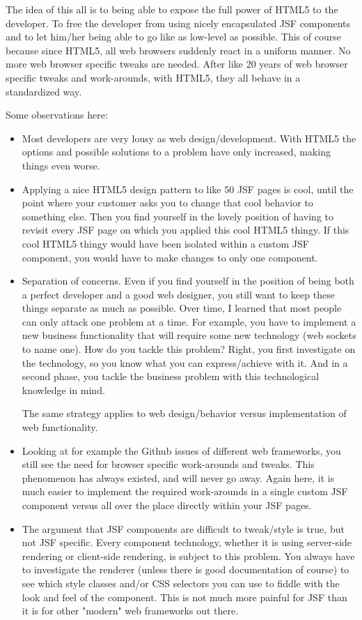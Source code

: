 The idea of this all is to being able to expose the full power of HTML5 to the developer.
To free the developer from using nicely encapsulated JSF components and to let him/her being able to go like as low-level as possible.
This of course because since HTML5, all web browsers suddenly react in a uniform manner.
No more web browser specific tweaks are needed.
After like 20 years of web browser specific tweaks and work-arounds, with HTML5, they all behave in a standardized way.

Some observations here:
\begin{itemize}
	\item Most developers are very lousy as web design/development. With HTML5 the options and possible solutions to a problem have only increased, making things even worse.
	\item Applying a nice HTML5 design pattern to like 50 JSF pages is cool, until the point where your customer asks you to change that cool behavior to something else. Then you find yourself in the lovely position of having to revisit every JSF page on which you applied this cool HTML5 thingy.
	If this cool HTML5 thingy would have been isolated within a custom JSF component, you would have to make changes to only one component.
	\item Separation of concerns. Even if you find yourself in the position of being both a perfect developer and a good web designer, you still want to keep these things separate as much as possible.
	Over time, I learned that most people can only attack one problem at a time.
	For example, you have to implement a new business functionality that will require some new technology (web sockets to name one).
	How do you tackle this problem? Right, you first investigate on the technology, so you know what you can express/achieve with it.
	And in a second phase, you tackle the business problem with this technological knowledge in mind.
	
	The same strategy applies to web design/behavior versus implementation of web functionality.
	
	\item Looking at for example the Github issues of different web frameworks,
	you still see the need for browser specific work-arounds and tweaks.
	This phenomenon has always existed, and will never go away.
	Again here, it is much easier to implement the required work-arounds in a single custom JSF component versus all over the place directly within your JSF pages.
	
	\item The argument that JSF components are difficult to tweak/style is true, but not JSF specific.
	Every component technology, whether it is using server-side rendering or client-side rendering,
	is subject to this problem.
	You always have to investigate the renderer (unless there is good documentation of course)
	to see which style classes and/or CSS selectors you can use to fiddle with the look and feel of the component.
	This is not much more painful for JSF than it is for other "modern" web frameworks out there.
\end{itemize}

